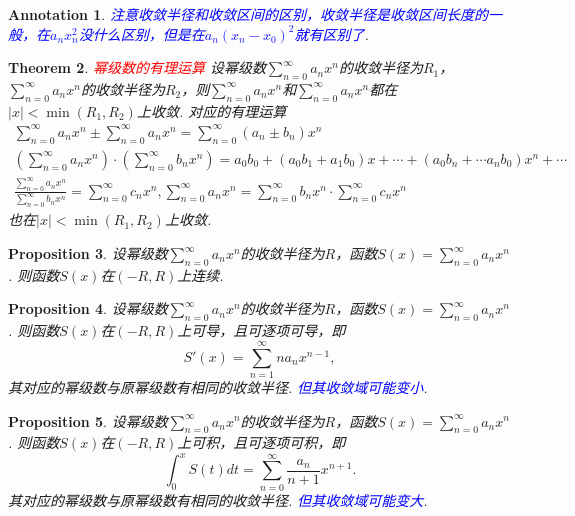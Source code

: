 \documentclass{article}
\newtheorem{theorem}{Theorem}[section]
\newtheorem{proposition}[theorem]{Proposition}
\newtheorem{annotation}[theorem]{Annotation}
\newcommand{\redt}[1]{\textcolor{red}{#1}}
\newcommand{\bluet}[1]{\textcolor{blue}{#1}}
\begin{document}
\begin{annotation}
\rm \bluet{注意收敛半径和收敛区间的区别，收敛半径是收敛区间长度的一般，在$a_nx_n^2$没什么区别，但是在$a_n(x_n-x_0)^2$就有区别了}. 
\end{annotation}

\begin{theorem}
\rm \redt{幂级数的有理运算} 设幂级数$\sum\limits_{n=0}^{\infty}a_nx^n$的收敛半径为$R_1$，$\sum\limits_{n=0}^{\infty}a_nx^n$的收敛半径为$R_2$，则$\sum\limits_{n=0}^{\infty}a_nx^n$和$\sum\limits_{n=0}^{\infty}a_nx^n$都在$|x| < \min(R_1,R_2)$上收敛. 对应的有理运算
$$
\begin{array}{ll}
\sum\limits_{n=0}^{\infty}a_nx^n \pm \sum\limits_{n=0}^{\infty}a_nx^n = \sum\limits_{n=0}^{\infty}(a_n\pm b_n)x^n \\ 
\left(\sum\limits_{n=0}^{\infty}a_nx^n \right) \cdot \left( \sum\limits_{n=0}^{\infty}b_nx^n \right) = a_0b_0  + (a_0b_1+a_1b_0)x + \cdots + (a_0b_n + \cdots a_nb_0)x^n +\cdots \\
\frac{\sum\limits_{n=0}^{\infty}a_nx^n}{\sum\limits_{n=0}^{\infty}b_nx^n} = \sum\limits_{n=0}^{\infty}c_nx^n, \sum\limits_{n=0}^{\infty}a_nx^n  =  \sum\limits_{n=0}^{\infty}b_nx^n \cdot \sum\limits_{n=0}^{\infty}c_nx^n
\end{array}
$$
也在$|x| < \min(R_1,R_2)$上收敛. 
\end{theorem}

\begin{proposition}
\rm 设幂级数$\sum\limits_{n=0}^{\infty}a_nx^n$的收敛半径为$R$，函数$S(x) = \sum\limits_{n=0}^{\infty}a_nx^n$. 则函数$S(x)$在$(-R,R)$上连续.
\end{proposition}

\begin{proposition}
\rm 设幂级数$\sum\limits_{n=0}^{\infty}a_nx^n$的收敛半径为$R$，函数$S(x) = \sum\limits_{n=0}^{\infty}a_nx^n$. 则函数$S(x)$在$(-R,R)$上可导，且可逐项可导，即
$$
S'(x) = \sum\limits_{n=1}^{\infty}na_nx^{n-1},
$$
其对应的幂级数与原幂级数有相同的收敛半径. \bluet{但其收敛域可能变小}.
\end{proposition}

\begin{proposition}
\rm 设幂级数$\sum\limits_{n=0}^{\infty}a_nx^n$的收敛半径为$R$，函数$S(x) = \sum\limits_{n=0}^{\infty}a_nx^n$. 则函数$S(x)$在$(-R,R)$上可积，且可逐项可积，即
$$
\int_0^x S(t)dt  = \sum\limits_{n=0}^{\infty} \frac{a_n}{n+1}x^{n+1}.
$$
其对应的幂级数与原幂级数有相同的收敛半径. \bluet{但其收敛域可能变大}.
\end{proposition}
\end{document}
